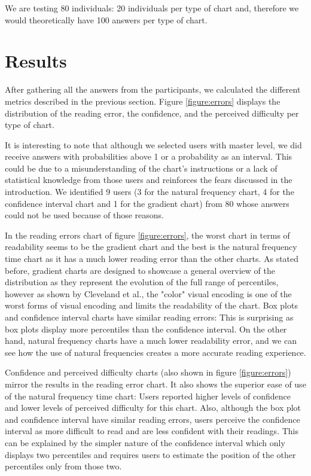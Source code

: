 \documentclass[a4paper,3p,sort&compress]{elsarticle}
\begin{document}
We are testing 80 individuals: 20 individuals per type of chart and, therefore we would theoretically have 100 answers per
type of chart.

\section{Results}
\label{sec:results}


After gathering all the answers from the participants, we calculated the different metrics described in the previous section.
 Figure \ref{figure:errors} displays
the distribution of the reading error, the confidence, and the perceived difficulty per type of chart.

It is interesting to note that although we selected users with master level, we did receive answers with probabilities
above 1 or a probability as an interval. This could be due to a misunderstanding of the chart's instructions or
a lack of statistical knowledge from those
users and reinforces the fears discussed in the introduction. We identified 9 users (3 for the natural frequency chart,
4 for the confidence interval chart and 1 for the gradient chart)
 from 80 whose answers could not be used because of those reasons.

In the reading errors chart of figure \ref{figure:errors}, the worst chart in terms of readability seems to be the
gradient chart and the best is the natural frequency time chart as it has a much lower reading error than the other charts. As stated before,
gradient charts are designed to showcase a general overview of the distribution as they represent the evolution of the
full range of percentiles, however as shown by Cleveland et al., the "color" visual encoding is one of the
worst forms of visual encoding and limits the readability of the chart. Box plots and confidence interval charts have similar reading errors: This is surprising
as box plots display more percentiles than the confidence interval. On the other hand, natural
frequency charts have a much lower readability error, and we can see how the use of natural frequencies creates a more accurate reading experience.

Confidence and perceived difficulty charts (also shown in figure \ref{figure:errors}) mirror the results in the reading error chart.
It also shows the superior ease of use
of the natural frequency time chart: Users reported higher levels of confidence and
lower levels of perceived difficulty for this chart. Also, although the box plot and confidence interval have similar reading errors,
users perceive the confidence interval as more difficult to read and are less confident with their readings. This can be explained by
the simpler nature of the confidence interval which only displays two percentiles and requires users to estimate the position of the other
percentiles only from those two.
\end{document}
